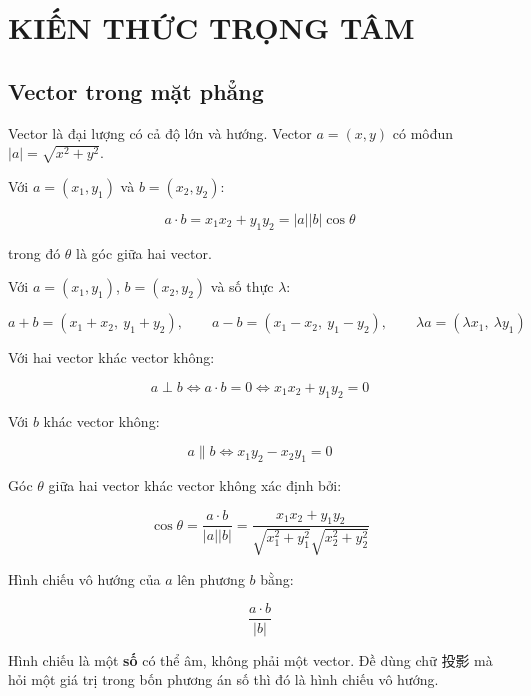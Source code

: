 \documentclass[11pt, a4paper]{article}
\begin{document}
\section{KIẾN THỨC TRỌNG TÂM}

\subsection{Vector trong mặt phẳng}

\begin{dinhnghia}
Vector là đại lượng có cả độ lớn và hướng. Vector $a = (x, y)$ có môđun $\lvert a \rvert = \sqrt{x^2 + y^2}$.
\end{dinhnghia}
\begin{dinhnghia}
Với $a = (x_1, y_1)$ và $b = (x_2, y_2)$:

$$a \cdot b = x_1x_2 + y_1y_2 = \lvert a \rvert \lvert b \rvert \cos\theta$$

trong đó $\theta$ là góc giữa hai vector.
\end{dinhnghia}
\begin{dinhly}
Với $a = (x_1, y_1)$, $b = (x_2, y_2)$ và số thực $\lambda$:

$$a + b = (x_1 + x_2,\ y_1 + y_2), \qquad a - b = (x_1 - x_2,\ y_1 - y_2), \qquad \lambda a = (\lambda x_1,\ \lambda y_1)$$
\end{dinhly}
\begin{dinhly}
Với hai vector khác vector không:

$$a \perp b \iff a \cdot b = 0 \iff x_1x_2 + y_1y_2 = 0$$
\end{dinhly}
\begin{dinhly}
Với $b$ khác vector không:

$$a \parallel b \iff x_1y_2 - x_2y_1 = 0$$
\end{dinhly}
\begin{dinhly}
Góc $\theta$ giữa hai vector khác vector không xác định bởi:

$$\cos\theta = \frac{a \cdot b}{\lvert a \rvert \lvert b \rvert} = \frac{x_1x_2 + y_1y_2}{\sqrt{x_1^2 + y_1^2}\sqrt{x_2^2 + y_2^2}}$$
\end{dinhly}
\begin{dinhly}
Hình chiếu vô hướng của $a$ lên phương $b$ bằng:

$$\frac{a \cdot b}{\lvert b \rvert}$$

 Hình chiếu là một \textbf{số} có thể âm, không phải một vector. Đề dùng chữ 投影 mà hỏi một giá trị trong bốn phương án số thì đó là hình chiếu vô hướng.
\end{dinhly}
\end{document}
